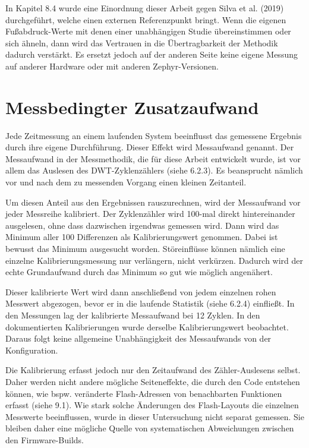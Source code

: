 In Kapitel 8.4 wurde eine Einordnung dieser Arbeit gegen Silva et al. (2019) durchgef{\"u}hrt, welche einen externen Referenzpunkt bringt. Wenn die eigenen Fu{\ss}abdruck-Werte mit denen einer unabh{\"a}ngigen Studie {\"u}bereinstimmen oder sich {\"a}hneln, dann wird das Vertrauen in die {\"U}bertragbarkeit der Methodik dadurch verst{\"a}rkt. Es ersetzt jedoch auf der anderen Seite keine eigene Messung auf anderer Hardware oder mit anderen Zephyr-Versionen.

\section{Messbedingter Zusatzaufwand}
Jede Zeitmessung an einem laufenden System beeinflusst das gemessene Ergebnis durch ihre eigene Durchf{\"u}hrung. Dieser Effekt wird Messaufwand genannt. Der Messaufwand in der Messmethodik, die f{\"u}r diese Arbeit entwickelt wurde, ist vor allem das Auslesen des DWT-Zyklenz{\"a}hlers (siehe 6.2.3). Es beansprucht n{\"a}mlich vor und nach dem zu messenden Vorgang einen kleinen Zeitanteil.

Um diesen Anteil aus den Ergebnissen rauszurechnen, wird der Messaufwand vor jeder Messreihe kalibriert. Der Zyklenz{\"a}hler wird 100-mal direkt hintereinander ausgelesen, ohne dass dazwischen irgendwas gemessen wird. Dann wird das Minimum aller 100 Differenzen als Kalibrierungswert genommen. Dabei ist bewusst das Minimum ausgesucht worden. St{\"o}reinfl{\"u}sse k{\"o}nnen n{\"a}mlich eine einzelne Kalibrierungsmessung nur verl{\"a}ngern, nicht verk{\"u}rzen. Dadurch wird der echte Grundaufwand durch das Minimum so gut wie m{\"o}glich angen{\"a}hert.

Dieser kalibrierte Wert wird dann anschlie{\ss}end von jedem einzelnen rohen Messwert abgezogen, bevor er in die laufende Statistik (siehe 6.2.4) einflie{\ss}t. In den Messungen lag der kalibrierte Messaufwand bei 12 Zyklen. In den dokumentierten Kalibrierungen wurde derselbe Kalibrierungswert beobachtet. Daraus folgt keine allgemeine Unabh{\"a}ngigkeit des Messaufwands von der Konfiguration.

Die Kalibrierung erfasst jedoch nur den Zeitaufwand des Z{\"a}hler-Auslesens selbst. Daher werden nicht andere m{\"o}gliche Seiteneffekte, die durch den Code entstehen k{\"o}nnen, wie bspw. ver{\"a}nderte Flash-Adressen von benachbarten Funktionen erfasst (siehe 9.1). Wie stark solche {\"A}nderungen des Flash-Layouts die einzelnen Messwerte beeinflussen, wurde in dieser Untersuchung nicht separat gemessen. Sie bleiben daher eine m{\"o}gliche Quelle von systematischen Abweichungen zwischen den Firmware-Builds.

